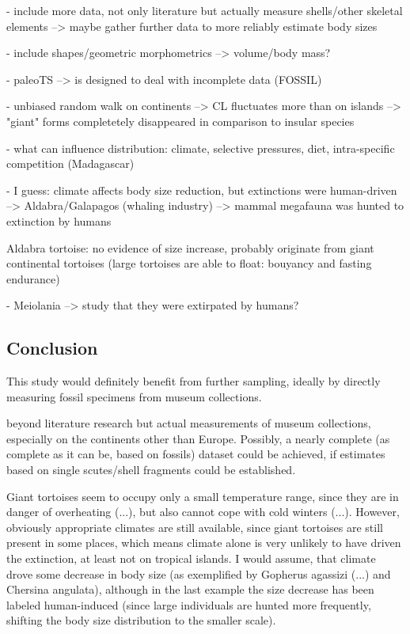 - include more data, not only literature but actually measure shells/other skeletal elements --> maybe gather further data to more reliably estimate body sizes

- include shapes/geometric morphometrics --> volume/body mass?

- paleoTS --> is designed to deal with incomplete data (FOSSIL)

- unbiased random walk on continents --> CL fluctuates more than on islands --> "giant" forms completetely disappeared in comparison to insular species

- what can influence distribution: climate, selective pressures, diet, intra-specific competition (Madagascar)

- I guess: climate affects body size reduction, but extinctions were human-driven
--> Aldabra/Galapagos (whaling industry)
--> mammal megafauna was hunted to extinction by humans





Aldabra tortoise: no evidence of size increase, probably originate from giant continental tortoises (large tortoises are able to float: bouyancy and fasting endurance)

- Meiolania --> study that they were extirpated by humans?

\subsection{Conclusion}


This study would definitely benefit from further sampling, ideally by directly measuring fossil specimens from museum collections.

beyond literature research but actual measurements of museum collections, especially on the continents other than Europe. Possibly, a nearly complete (as complete as it can be, based on fossils) dataset could be achieved, if estimates based on single scutes/shell fragments could be established.

Giant tortoises seem to occupy only a small temperature range, since they are in danger of overheating (...), but also cannot cope with cold winters (...). However, obviously appropriate climates are still available, since giant tortoises are still present in some places, which means climate alone is very unlikely to have driven the extinction, at least not on tropical islands.
I would assume, that climate drove some decrease in body size (as exemplified by Gopherus agassizi (...) and Chersina angulata), although in the last example the size decrease has been labeled human-induced (since large individuals are hunted more frequently, shifting the body size distribution to the smaller scale).


